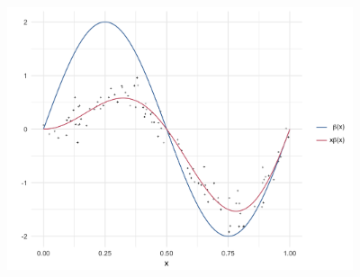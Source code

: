 \begin{figure}[h]
\centering
 \graphicspath{{img/}}
  \includegraphics[width=4in, height=4in]{PS_penalty_section_figure_5.png}
\end{figure}

